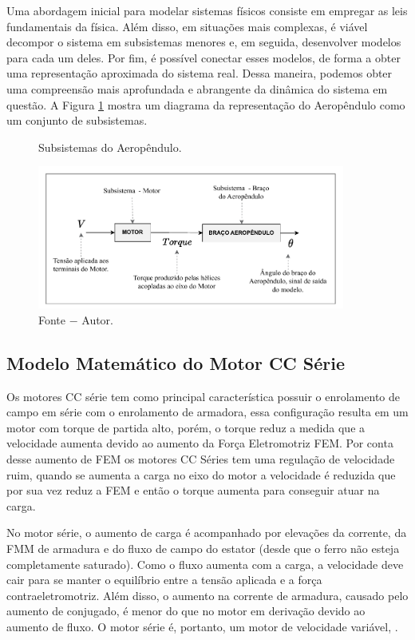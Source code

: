 


Uma abordagem inicial para modelar sistemas físicos consiste em empregar as leis fundamentais da física. Além disso, em situações mais complexas, é viável decompor o sistema em subsistemas menores e, em seguida, desenvolver modelos para cada um deles. Por fim, é possível conectar esses modelos, de forma a obter uma representação aproximada do sistema real. Dessa maneira, podemos obter uma compreensão mais aprofundada e abrangente da dinâmica do sistema em questão. A Figura \ref{fig4:image_01} mostra um diagrama da representação do Aeropêndulo como um conjunto de subsistemas.


\begin{figure}[!h]
	\centering
	\caption{Subsistemas do  Aeropêndulo.}
            \includegraphics[width=0.9\textwidth]{Capitulos/4_desenvolvimento/4_figuras/subsistemas_aeropendulo.pdf}
	\caption*{Fonte $-$ Autor.}
        \label{fig4:image_01}
\end{figure}


\subsection{Modelo Matemático do Motor CC Série}
\label{modelagem_motorccserie}

Os motores CC série tem como principal característica possuir o enrolamento de campo em série com o enrolamento de armadora, essa configuração resulta em um motor com torque de partida alto, porém, o torque reduz a medida que a velocidade aumenta devido ao aumento da Força Eletromotriz FEM. Por conta desse aumento de FEM os motores CC Séries tem uma regulação de velocidade ruim, quando se aumenta a carga no eixo do motor a velocidade é reduzida que por sua vez reduz a FEM e então o torque aumenta para conseguir atuar na carga.


\begin{citacao}
    No motor série, o aumento de carga é acompanhado por elevações da corrente,
    da FMM de armadura e do fluxo de campo do estator (desde que o ferro não esteja
    completamente saturado). Como o fluxo aumenta com a carga, a velocidade deve cair
    para se manter o equilíbrio entre a tensão aplicada e a força contraeletromotriz. Além
    disso, o aumento na corrente de armadura, causado pelo aumento de conjugado, é
    menor do que no motor em derivação devido ao aumento de fluxo. O motor série
    é, portanto, um motor de velocidade variável, .
\end{citacao}


